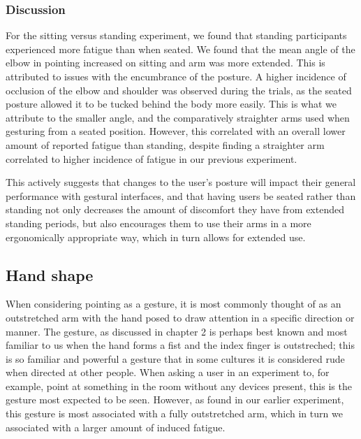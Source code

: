 \subsubsection{Discussion}


For the sitting versus standing experiment, we found that standing participants experienced more fatigue than when seated. We found that the mean angle of the elbow in pointing increased on sitting and arm was more extended. This is attributed to issues with the encumbrance of the posture. A higher incidence of occlusion of the elbow and shoulder was observed during the trials, as the seated posture allowed it to be tucked behind the body more easily. This is what we attribute to the smaller angle, and the comparatively straighter arms used when gesturing from a seated position. However, this correlated with an overall lower amount of reported fatigue than standing, despite finding a straighter arm correlated to higher incidence of fatigue in our previous experiment. 

This actively suggests that changes to the user's posture will impact their general performance with gestural interfaces, and that having users be seated rather than standing not only decreases the amount of discomfort they have from extended standing periods, but also encourages them to use their arms in a more ergonomically appropriate way, which in turn allows for extended use. 

\subsection{Hand shape}

When considering pointing as a gesture, it is most commonly thought of as an outstretched arm with the hand posed to draw attention in a specific direction or manner. The gesture, as discussed in chapter 2 is perhaps best known and most familiar to us when the hand forms a fist and the index finger is outstreched; this is so familiar and powerful a gesture that in some cultures it is considered rude when directed at other people. When asking a user in an experiment to, for example, point at something in the room without any devices present, this is the gesture most expected to be seen. However, as found in our earlier experiment, this gesture is most associated with a fully outstretched arm, which in turn we associated with a larger amount of induced fatigue.

